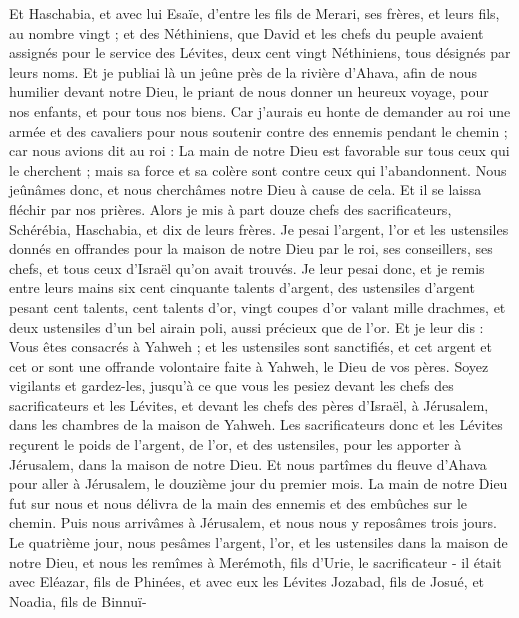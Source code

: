 \begin{multicols}{2}
Et Haschabia, et avec lui Esaïe, d'entre les fils de Merari, ses frères, et leurs fils, au nombre vingt ;
et des Néthiniens, que David et les chefs du peuple avaient assignés pour le service des Lévites, deux cent vingt Néthiniens, tous désignés par leurs noms.
Et je publiai là un jeûne près de la rivière d'Ahava, afin de nous humilier devant notre Dieu, le priant de nous donner un heureux voyage, pour nos enfants, et pour tous nos biens.
Car j'aurais eu honte de demander au roi une armée et des cavaliers pour nous soutenir contre des ennemis pendant le chemin ; car nous avions dit au roi : La main de notre Dieu est favorable sur tous ceux qui le cherchent ; mais sa force et sa colère sont contre ceux qui l'abandonnent.
Nous jeûnâmes donc, et nous cherchâmes notre Dieu à cause de cela. Et il se laissa fléchir par nos prières.
Alors je mis à part douze chefs des sacrificateurs, Schérébia, Haschabia, et dix de leurs frères.
Je pesai l'argent, l'or et les ustensiles donnés en offrandes pour la maison de notre Dieu par le roi, ses conseillers, ses chefs, et tous ceux d'Israël qu'on avait trouvés.
Je leur pesai donc, et je remis entre leurs mains six cent cinquante talents d'argent, des ustensiles d'argent pesant cent talents, cent talents d'or,
vingt coupes d'or valant mille drachmes, et deux ustensiles d’un bel airain poli, aussi précieux que de l'or.
Et je leur dis : Vous êtes consacrés à Yahweh ; et les ustensiles sont sanctifiés, et cet argent et cet or sont une offrande volontaire faite à Yahweh, le Dieu de vos pères.
Soyez vigilants et gardez-les, jusqu'à ce que vous les pesiez devant les chefs des sacrificateurs et les Lévites, et devant les chefs des pères d'Israël, à Jérusalem, dans les chambres de la maison de Yahweh.
Les sacrificateurs donc et les Lévites reçurent le poids de l'argent, de l'or, et des ustensiles, pour les apporter à Jérusalem, dans la maison de notre Dieu.
Et nous partîmes du fleuve d'Ahava pour aller à Jérusalem, le douzième jour du premier mois. La main de notre Dieu fut sur nous et nous délivra de la main des ennemis et des  embûches sur le chemin.
Puis nous arrivâmes à Jérusalem, et nous nous y reposâmes trois jours.
Le quatrième jour, nous pesâmes l'argent, l'or, et les ustensiles dans la maison de notre Dieu, et nous les remîmes à Merémoth, fils d'Urie, le sacrificateur - il était avec Eléazar, fils de Phinées, et avec eux les Lévites Jozabad, fils de Josué, et Noadia, fils de Binnuï-

\end{multicols}
